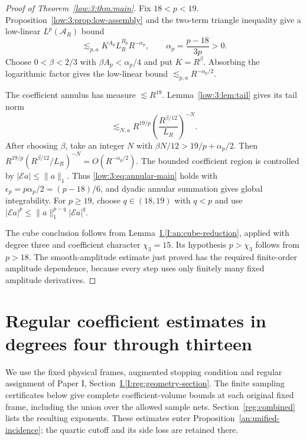 \documentclass[11pt]{amsart}
\theoremstyle{definition}
\theoremstyle{remark}
\newcommand{\norm}[1]{\lVert #1\rVert}
\newcommand{\abs}[1]{\lvert #1\rvert}
\numberwithin{equation}{section}
\newcommand{\partIref}[1]{\hyperref[I:#1]{I.\ref*{I:#1}}}
\begin{document}
\begin{proof}[Proof of Theorem~\ref{low:3:thm:main}]
Fix $18<p<19$. Proposition~\ref{low:3:prop:low-assembly} and the two-term triangle inequality give a low-linear $L^p(\mathcal A_R)$ bound
\[
\lesssim_{p,a}K^{A_p}L_R^{B_p}R^{-\alpha_p},\qquad \alpha_p=\frac{p-18}{3p}>0.
\]
Choose $0<\beta<2/3$ with $\beta A_p<\alpha_p/4$ and put $K=R^\beta$. Absorbing the logarithmic factor gives the low-linear bound $\lesssim_{p,a}R^{-\alpha_p/2}$.

The coefficient annulus has measure $\lesssim R^{19}$. Lemma~\ref{low:3:lem:tail} gives its tail norm
\[
\lesssim_{N,a}R^{19/p}\left(\frac{R^{\beta/12}}{L_R}\right)^{-N}.
\]
After choosing $\beta$, take an integer $N$ with $\beta N/12>19/p+\alpha_p/2$. Then $R^{19/p}(R^{\beta/12}/L_R)^{-N}=O(R^{-\alpha_p/2})$. The bounded coefficient region is controlled by $\abs{\mathcal E a}\leq\norm a_1$. Thus \eqref{low:3:eq:annular-main} holds with $\epsilon_p=p\alpha_p/2=(p-18)/6$, and dyadic annular summation gives global integrability. For $p\geq19$, choose $q\in(18,19)$ with $q<p$ and use $\abs{\mathcal E a}^p\leq\norm a_1^{p-q}\abs{\mathcal E a}^q$.

The cube conclusion follows from Lemma~\partIref{an:cube-reduction}, applied with degree three and coefficient character $\chi_3=15$. Its hypothesis $p>\chi_3$ follows from $p>18$. The smooth-amplitude estimate just proved has the required finite-order amplitude dependence, because every step uses only finitely many fixed amplitude derivatives.
\end{proof}


\section{Regular coefficient estimates in degrees four through thirteen}\label{reg:finite-section}\label{low:appendix}\label{low:section}\label{reg:physical-specializations}

We use the fixed physical frames, augmented stopping condition and regular assignment of Paper I, Section~\partIref{reg:geometry-section}. The finite sampling certificates below give complete coefficient-volume bounds at each original fixed frame, including the union over the allowed sample nets. Section~\ref{reg:combined} lists the resulting exponents. These estimates enter Proposition~\ref{an:unified-incidence}; the quartic cutoff and its side loss are retained there.
\end{document}
